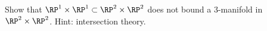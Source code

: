 Show that $\RP^1\times \RP^1\subset \RP^2\times \RP^2$ does not bound a
$3$-manifold in $\RP^2\times \RP^2$. Hint: intersection theory.
